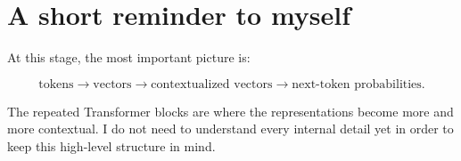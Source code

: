\documentclass[11pt]{article}
\begin{document}
\section*{A short reminder to myself}

At this stage, the most important picture is:

\[
  \text{tokens}
  \longrightarrow
  \text{vectors}
  \longrightarrow
  \text{contextualized vectors}
  \longrightarrow
  \text{next-token probabilities}.
\]

The repeated Transformer blocks are where the representations become more and
more contextual. I do not need to understand every internal detail yet in order
to keep this high-level structure in mind.
\end{document}
